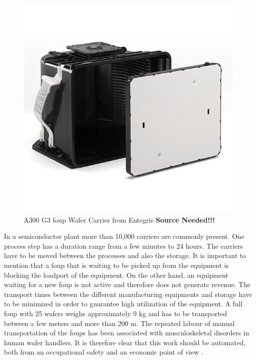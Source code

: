 \begin{figure}[h]
    \centering
    \includegraphics[scale=0.5]{pictures/product-a300g3foupwafercarriers-1-2.jpeg}
    \caption{A300 G3 \gls{foup} Wafer Carrier from Entegris \textbf{Source Needed!!!}} %
    \label{fig:Foup}
\end{figure}

In a semiconductor plant more than 10,000 carriers are commonly present. One process step has a duration range from a few minutes to 24 hours. The carriers have to be moved between the processes and also the storage. It is important to mention that a \gls{foup} that is waiting to be picked up from the equipment is blocking the loadport of the equipment. On the other hand, an equipment waiting for a new \gls{foup} is not active and therefore does not generate revenue. The transport times between the different manufacturing equipments and storage have to be minimized in order to guarantee high utilization of the equipment. A full \gls{foup} with 25 wafers weighs approximately 9 kg \cite{ManualFoupHandling} and has to be transported between a few meters and more than 200 m. The repeated labour of manual transportation of the \gls{foup}s has been associated with musculoskeletal disorders in human wafer handlers. It is therefore clear that this work should be automated, both from an occupational safety and an economic point of view \cite{ManualFoupHandling}.\newpage

